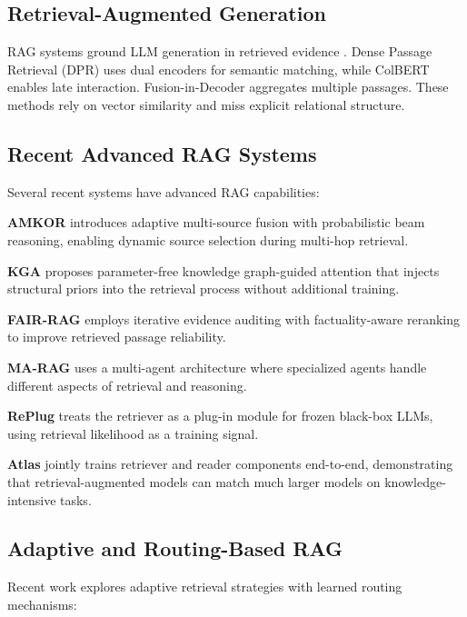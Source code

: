 \documentclass[10pt,twocolumn]{article}
\begin{document}
\subsection{Retrieval-Augmented Generation}

RAG systems ground LLM generation in retrieved evidence \cite{lewis2020rag}. Dense Passage Retrieval (DPR) \cite{karpukhin2020dpr} uses dual encoders for semantic matching, while ColBERT \cite{khattab2020colbert} enables late interaction. Fusion-in-Decoder \cite{izacard2021fid} aggregates multiple passages. These methods rely on vector similarity and miss explicit relational structure.

\subsection{Recent Advanced RAG Systems}
\label{sec:recent_rag}

Several recent systems have advanced RAG capabilities:

\textbf{AMKOR} \cite{fang2024amkor} introduces adaptive multi-source fusion with probabilistic beam reasoning, enabling dynamic source selection during multi-hop retrieval.

\textbf{KGA} \cite{wang2024kga} proposes parameter-free knowledge graph-guided attention that injects structural priors into the retrieval process without additional training.

\textbf{FAIR-RAG} \cite{chen2024fairrag} employs iterative evidence auditing with factuality-aware reranking to improve retrieved passage reliability.

\textbf{MA-RAG} \cite{li2024marag} uses a multi-agent architecture where specialized agents handle different aspects of retrieval and reasoning.

\textbf{RePlug} \cite{shi2024replug} treats the retriever as a plug-in module for frozen black-box LLMs, using retrieval likelihood as a training signal.

\textbf{Atlas} \cite{izacard2023atlas} jointly trains retriever and reader components end-to-end, demonstrating that retrieval-augmented models can match much larger models on knowledge-intensive tasks.

\subsection{Adaptive and Routing-Based RAG}
\label{sec:adaptive_rag}

Recent work explores adaptive retrieval strategies with learned routing mechanisms:
\end{document}
